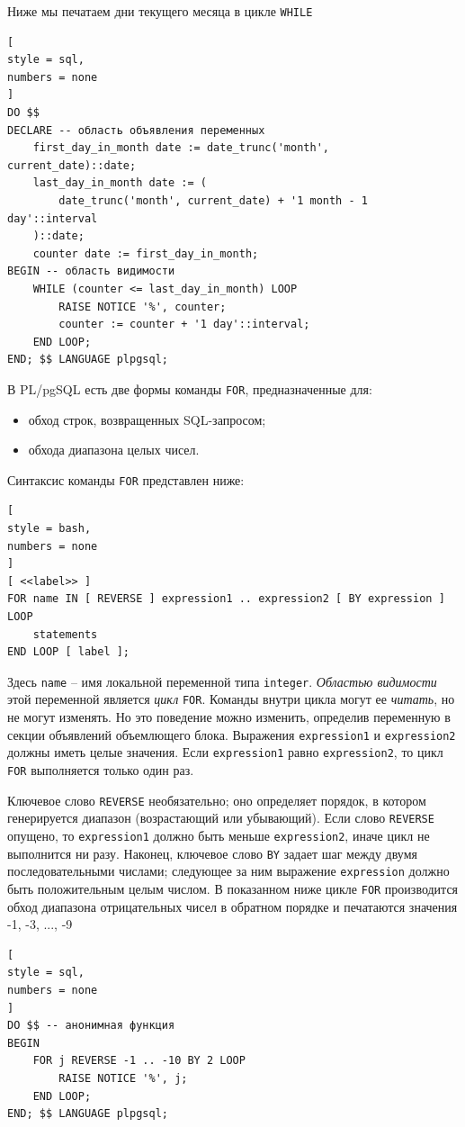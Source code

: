\documentclass[%
	11pt,
	a4paper,
	utf8,
		]{article}
\begin{document}
Ниже мы печатаем дни текущего месяца в цикле \texttt{WHILE}
\begin{lstlisting}[
style = sql,
numbers = none
]
DO $$
DECLARE -- область объявления переменных
    first_day_in_month date	:= date_trunc('month', current_date)::date;
    last_day_in_month date := (
        date_trunc('month', current_date) + '1 month - 1 day'::interval
    )::date;
    counter date := first_day_in_month;
BEGIN -- область видимости
    WHILE (counter <= last_day_in_month) LOOP
        RAISE NOTICE '%', counter;
        counter := counter + '1 day'::interval;
    END LOOP;
END; $$ LANGUAGE plpgsql;
\end{lstlisting}

В PL/pgSQL есть две формы команды \texttt{FOR}, предназначенные для:
\begin{itemize}
	\item обход строк, возвращенных SQL-запросом;
	
	\item обхода диапазона целых чисел.
\end{itemize}

Синтаксис команды \texttt{FOR} представлен ниже:
\begin{lstlisting}[
style = bash,
numbers = none
]
[ <<label>> ]
FOR name IN [ REVERSE ] expression1 .. expression2 [ BY expression ] LOOP
    statements
END LOOP [ label ];
\end{lstlisting}

Здесь \texttt{name} -- имя локальной переменной типа \texttt{integer}. \emph{Областью видимости} этой переменной является \emph{цикл} \texttt{FOR}. Команды внутри цикла могут ее \emph{читать}, но не могут изменять. Но это поведение можно изменить, определив переменную в секции объявлений объемлющего блока. Выражения \texttt{expression1} и \texttt{expression2} должны иметь целые значения. Если \texttt{expression1} равно \texttt{expression2}, то цикл \texttt{FOR} выполняется только один раз.

Ключевое слово \texttt{REVERSE} необязательно; оно определяет порядок, в котором генерируется диапазон (возрастающий или убывающий). Если слово \texttt{REVERSE} опущено, то \texttt{expression1} должно быть меньше \texttt{expression2}, иначе цикл не выполнится ни разу. Наконец, ключевое слово \texttt{BY} задает шаг между двумя последовательными числами; следующее за ним выражение \texttt{expression} должно быть положительным целым числом. В показанном ниже цикле \texttt{FOR} производится обход диапазона отрицательных чисел в обратном порядке и печатаются значения -1, -3, ..., -9
\begin{lstlisting}[
style = sql,
numbers = none
]
DO $$ -- анонимная функция
BEGIN
    FOR j REVERSE -1 .. -10 BY 2 LOOP
        RAISE NOTICE '%', j;
    END LOOP;
END; $$ LANGUAGE plpgsql;
\end{lstlisting}
\end{document}
